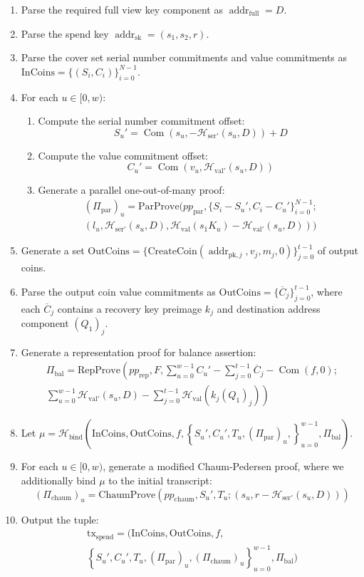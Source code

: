 \documentclass{llncs}
\newcommand{\hash}{\mathcal{H}}
\newcommand{\addr}{\operatorname{addr}}
\newcommand{\com}{\operatorname{Com}}
\begin{document}
\begin{enumerate}
    \item Parse the required full view key component as $\addr_{\text{full}} = D$.
    \item Parse the spend key $\addr_{\text{sk}} = (s_1, s_2, r)$.
    \item Parse the cover set serial number commitments and value commitments as $\text{InCoins} = \{(S_i, C_i)\}_{i=0}^{N-1}$.
    \item For each $u \in [0,w)$:
    \begin{enumerate}
        \item Compute the serial number commitment offset: $$S_u' = \com(s_u, -\hash_{\text{ser}'}(s_u, D)) + D$$
        \item Compute the value commitment offset: $$C_u' = \com(v_u, \hash_{\text{val}'}(s_u, D))$$
        \item Generate a parallel one-out-of-many proof:
        \begin{multline*}
        (\Pi_{\text{par}})_u = \text{ParProve}(pp_{\text{par}},\{S_i - S_u', C_i - C_u'\}_{i=0}^{N-1}; \\
        (l_u, \hash_{\text{ser}'}(s_u, D), \hash_{\text{val}}(s_1 K_u) - \hash_{\text{val}'}(s_u, D)))
        \end{multline*}
    \end{enumerate}
    \item Generate a set $\text{OutCoins} = \{\text{CreateCoin}(\addr_{\text{pk},j}, v_j, m_j, 0)\}_{j=0}^{t-1}$ of output coins.
    \item Parse the output coin value commitments as $\text{OutCoins} = \{\overline{C}_j\}_{j=0}^{t-1}$, where each $\overline{C}_j$ contains a recovery key preimage $k_j$ and destination address component $(Q_1)_j$.
    \item Generate a representation proof for balance assertion:
    \begin{multline*}
    \Pi_{\text{bal}} = \text{RepProve}\left( pp_{\text{rep}}, F, \sum_{u=0}^{w-1} C_u' - \sum_{j=0}^{t-1} \overline{C}_j - \com(f,0); \right. \\
    \left. \sum_{u=0}^{w-1} \hash_{\text{val}'}(s_u,D) - \sum_{j=0}^{t-1} \hash_{\text{val}}(k_j(Q_1)_j) \right)
    \end{multline*}
    \item Let $\mu = \hash_{\text{bind}}( \text{InCoins}, \text{OutCoins}, f, \left\{ S_u', C_u', T_u, (\Pi_{\text{par}})_u, \right\}_{u=0}^{w-1}, \Pi_{\text{bal}} )$.
    \item For each $u \in [0,w)$, generate a modified Chaum-Pedersen proof, where we additionally bind $\mu$ to the initial transcript: $$(\Pi_{\text{chaum}})_u = \text{ChaumProve}(pp_{\text{chaum}},S_u', T_u; (s_u, r - \hash_{\text{ser}'}(s_u, D)))$$
    \item Output the tuple:
    \begin{multline*}
    \text{tx}_{\text{spend}} = ( \text{InCoins}, \text{OutCoins}, f, \\
    \left\{ S_u', C_u', T_u, (\Pi_{\text{par}})_u, (\Pi_{\text{chaum}})_u \right\}_{u=0}^{w-1}, \Pi_{\text{bal}} )
    \end{multline*}
\end{enumerate}
\end{document}

